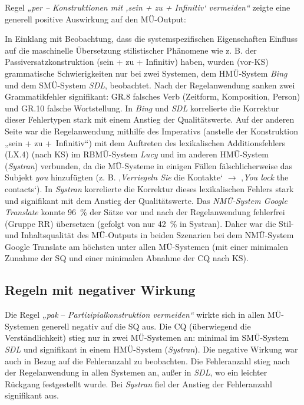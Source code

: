 Regel \textit{„per -- Konstruktionen mit ‚sein + zu + Infinitiv‘ vermeiden“} zeigte eine generell positive Auswirkung auf den MÜ-Output:


\largerpage%
In Einklang mit  Beobachtung, dass die systemspezifischen Eigenschaften Einfluss auf die maschinelle Übersetzung stilistischer Phänomene wie z. B. der Passiversatzkonstruktion (sein + zu + Infinitiv) haben, wurden (vor-KS) grammatische Schwierigkeiten nur bei zwei Systemen, dem HMÜ-System \textit{Bing} und dem SMÜ-System \textit{SDL}, beobachtet. Nach der Regelanwendung sanken zwei Grammatikfehler signifikant: GR.8 falsches Verb (Zeitform, Komposition, Person) und GR.10 falsche Wortstellung. In \textit{Bing} und \textit{SDL} korrelierte die Korrektur dieser Fehlertypen stark mit einem Anstieg der Qualitätswerte. Auf der anderen Seite war die Regelanwendung mithilfe des Imperativs (anstelle der Konstruktion „sein + zu +~Infinitiv“) mit dem Auftreten des lexikalischen Additionsfehlers (LX.4) (nach KS) im RBMÜ-System \textit{Lucy} und im anderen HMÜ-System (\textit{Systran}) verbunden, da die MÜ-Systeme in einigen Fällen fälschlicherweise das Subjekt \textit{you} hinzufügten (z. B. ‚\textit{Verriegeln Sie} die Kontakte‘ $\to$ ‚\textit{You lock} the contacts‘). In \textit{Systran} korrelierte die Korrektur dieses lexikalischen Fehlers stark und signifikant mit dem Anstieg der Qualitätswerte. Das \textit{NMÜ-System Google Translate} konnte 96~\% der Sätze vor und nach der Regelanwendung fehlerfrei (Gruppe RR) übersetzen (gefolgt von nur 42~\% in Systran). Daher war die Stil- und Inhaltsqualität des MÜ-Outputs in beiden Szenarien bei dem NMÜ-System Google Translate am höchsten unter allen MÜ-Systemen (mit einer minimalen Zunahme der SQ und einer minimalen Abnahme der CQ nach KS).

\subsection{Regeln mit negativer Wirkung}
\largerpage
Die Regel \textit{„pak} -- \textit{Partizipialkonstruktion vermeiden“} wirkte sich in allen MÜ-Systemen generell negativ auf die SQ aus. Die CQ (überwiegend die Verständlichkeit) stieg nur in zwei MÜ-Systemen an: minimal im SMÜ-System \textit{SDL} und signifikant in einem HMÜ-System (\textit{Systran}). Die negative Wirkung war auch in Bezug auf die Fehleranzahl zu beobachten. Die Fehleranzahl stieg nach der Regelanwendung in allen Systemen an, außer in \textit{SDL}, wo ein leichter Rückgang festgestellt wurde. Bei \textit{Systran} fiel der Anstieg der Fehleranzahl signifikant aus.

